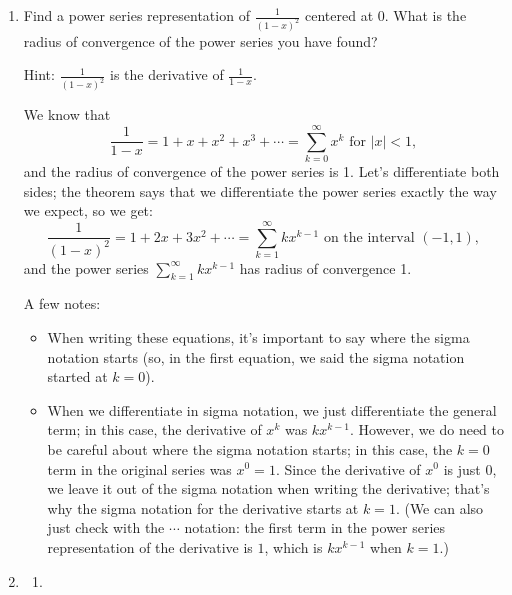 \documentclass[main]{subfiles}
\begin{document}
\begin{enumerate}
  \item 
  \begin{problem}[1.15in]
  Find a power series representation of $\displaystyle \frac{1}{(1 -
  x)^2}$ centered at $0$. What is the
  radius of convergence of the power series you have found?
  
  Hint: $\displaystyle \frac{1}{(1 - x)^2}$
  is the derivative of $\displaystyle \frac{1}{1 - x}$.
  \end{problem}

  \begin{solution}
  We know that
  \[ \frac{1}{1 - x} = 1 + x + x^2 + x^3 + \cdots = \sum_{k=0}^\infty
  x^k \textrm{ for } |x| < 1,\] and the radius of convergence of the
  power series is 1.  Let's differentiate both sides; the theorem says
  that we differentiate the power series exactly the way we expect, so
  we get: 
  \[ \frac{1}{(1 - x)^2} = 1 + 2x + 3x^2 + \cdots = \sum_{k=1}^\infty k
  x^{k-1} \textrm{ on the interval } (-1, 1),\] and the power series
  $\displaystyle \sum_{k=1}^\infty k x^{k-1}$ has radius of convergence
  1.

  {\LARGE\Pointinghand} A few notes:
  \begin{itemize}
    \item When writing these equations, it's important to say where the
    sigma notation starts (so, in the first equation, we said the sigma
    notation started at $k = 0$).
    \item When we differentiate in sigma notation, we just differentiate
    the general term; in this case, the derivative of $x^k$ was
    $kx^{k-1}$.  However, we do need to be careful about where the sigma
    notation starts; in this case, the $k = 0$ term in the original
    series was $x^0 = 1$.  Since the derivative of $x^0$ is just 0, we
    leave it out of the sigma notation when writing the derivative;
    that's why the sigma notation for the derivative starts at $k = 1$. 
    (We can also just check with the $\cdots$ notation: the first term
    in the power series representation of the derivative is $1$, which
    is $kx^{k-1}$ when $k = 1$.)      
  \end{itemize}
  \end{solution}
  
\pspace{\newpage}


\item 
  \begin{enumerate}
    \item


\end{enumerate}
\end{enumerate}
\end{document}
